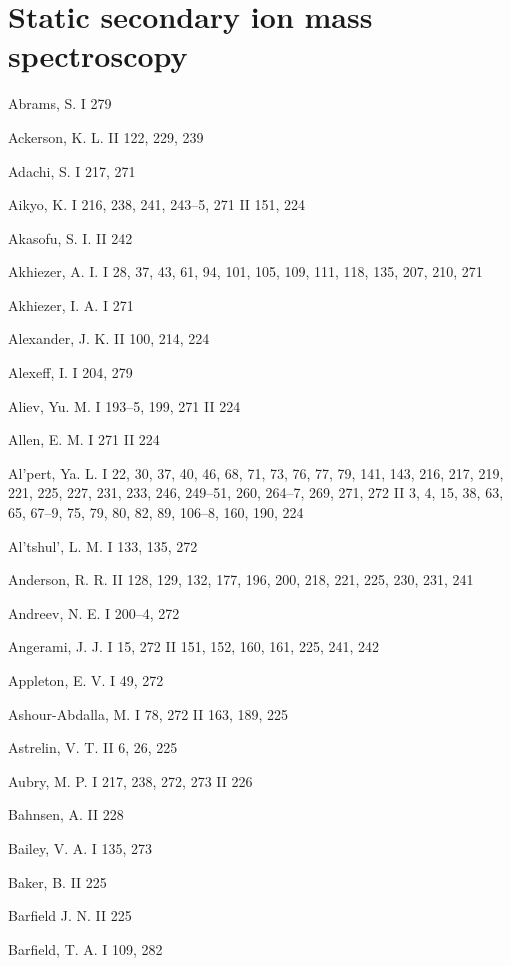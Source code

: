 \clearpage
\author[J. C. Vickerman]{J. C. VICKERMAN\\Affiliation}
\chapter{Static secondary ion mass spectroscopy}

\begin{theauthorindex}
\item Abrams, S. I 279
\item Ackerson, K. L. II 122, 229, 239
\item Adachi, S. I 217, 271
\item Aikyo, K. I 216, 238, 241, 243--5, 271 II 151, 224
\item Akasofu, S. I. II 242
\item Akhiezer, A. I. I 28, 37, 43, 61, 94, 101, 105, 109, 111,
      118, 135, 207, 210, 271
\item Akhiezer, I. A. I 271
\item Alexander, J. K. II 100, 214, 224
\item Alexeff, I. I 204, 279
\item Aliev, Yu. M. I 193--5, 199, 271 II 224
\item Allen, E. M. I 271 II 224
\item Al'pert, Ya. L. I 22, 30, 37, 40, 46, 68, 71, 73, 76, 77,
      79, 141, 143, 216, 217, 219, 221, 225, 227, 231, 233, 246,
      249--51, 260, 264--7, 269, 271, 272 II 3, 4, 15, 38, 63, 65,
      67--9, 75, 79, 80, 82, 89, 106--8, 160, 190, 224
\item Al'tshul', L. M. I 133, 135, 272
\item Anderson, R. R. II 128, 129, 132, 177, 196, 200, 218, 221,
      225, 230, 231, 241
\item Andreev, N. E. I 200--4, 272
\item Angerami, J. J. I 15, 272  II 151, 152, 160, 161, 225, 241, 242
\item Appleton, E. V. I 49, 272
\item Ashour-Abdalla, M. I 78, 272 II 163, 189, 225
\item Astrelin, V. T. II 6, 26, 225
\item Aubry, M. P. I 217, 238, 272, 273 II 226
\indexspace
\item Bahnsen, A. II 228
\item Bailey, V. A. I 135, 273
\item Baker, B. II 225
\item Barfield J. N. II 225
\item Barfield, T. A. I 109, 282

\end{theauthorindex}
